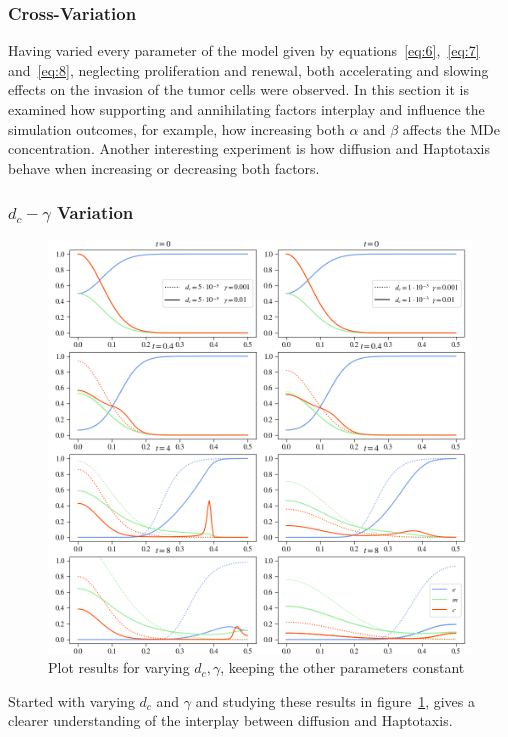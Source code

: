 \subsubsection*{Cross-Variation}
Having varied every parameter of the model given by equations~\ref{eq:6},~\ref{eq:7} and~\ref{eq:8}, neglecting proliferation and renewal, both accelerating and slowing effects on the invasion of the tumor cells were observed. In this section it is examined how supporting and annihilating factors interplay and influence the simulation outcomes, for example, how increasing both $\alpha$ and $\beta$ affects the MDe concentration. Another interesting experiment is how diffusion and Haptotaxis behave when increasing or decreasing both factors.

\subsubsection*{$d_c - \gamma$ Variation}
\begin{figure}[h!]
 \centering
 \includegraphics[width=\textwidth]{resources/images/dc_gamma_variation.png}
 \caption{Plot results for varying $d_c, \gamma$, keeping the other parameters constant}
 \label{fig:dc_gamma_variation}
\end{figure}
Started with varying $d_c$ and $\gamma$ and studying these results in figure~\ref{fig:dc_gamma_variation}, gives a clearer understanding of the interplay between diffusion and Haptotaxis.

